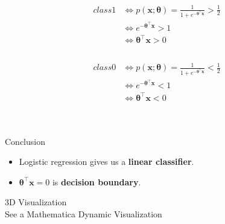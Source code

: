 \begin{frame}
\begin{centering}
\begin{equation}
\begin{aligned}
class 1 &\Leftrightarrow p(\mathbf{x};  \bm{\theta}) = \frac{1}{1+e^{-\bm{\theta} ^ {\intercal} \mathbf{x}}} > \frac{1}{2} \\
&\Leftrightarrow e^ {-\bm{\theta} ^ {\intercal} \mathbf{x}} > 1\\
&\Leftrightarrow \bm{\theta} ^ {\intercal} \mathbf{x} > 0\\
\end{aligned}
\end{equation}
\\
\begin{equation}
\begin{aligned}
class 0 &\Leftrightarrow p(\mathbf{x};  \bm{\theta}) = \frac{1}{1+e^{-\bm{\theta} ^ {\intercal} \mathbf{x}}} < \frac{1}{2} \\
&\Leftrightarrow e^ {-\bm{\theta} ^ {\intercal} \mathbf{x}} < 1\\
&\Leftrightarrow \bm{\theta} ^ {\intercal} \mathbf{x} < 0\\
\end{aligned}
\end{equation}
\end{centering}
\\
\begin{block}{Conclusion}
\begin{itemize}
\item Logistic regression gives us a \textbf{linear classifier}. \\
\item $\bm{\theta}  ^\intercal \mathbf{x} = 0$ is \textbf{decision boundary}. 
\end{itemize}
\end{block}
\end{frame}
\begin{frame}
3D Visualization \\
See a Mathematica Dynamic Visualization
\end{frame}
